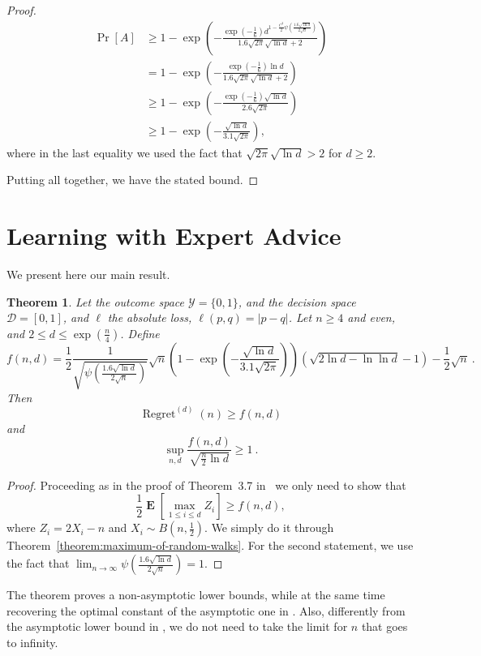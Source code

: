 \documentclass{article}
\DeclareMathOperator*{\Exp}{\mathbf{E}}
\DeclareMathOperator{\Regret}{Regret}
\newtheorem{theorem}{Theorem}
\begin{document}
\begin{proof}
\begin{align*}
\Pr[A]
& \ge 1 - \exp\left(-\frac{\exp\left(-\frac{1}{6}\right) d^{1-\frac{C^2}{2} \psi\left(\frac{1.6 \sqrt{\ln d}}{2 \sqrt{n}}\right)}}{1.6 \sqrt{2\pi} \sqrt{\ln d}+2}\right) \\
& = 1 - \exp\left(-\frac{\exp\left(-\frac{1}{6}\right) \ln d}{1.6 \sqrt{2\pi} \sqrt{\ln d}+2}\right) \\
& \ge 1 - \exp\left(-\frac{\exp\left(-\frac{1}{6}\right) \sqrt{\ln d}}{2.6 \sqrt{2\pi}}\right)\\
& \ge 1 - \exp\left(-\frac{\sqrt{\ln d}}{3.1 \sqrt{2\pi}}\right),
\end{align*}
where in the last equality we used the fact that $\sqrt{2\pi} \sqrt{\ln d} > 2$ for $d\ge 2$.

Putting all together, we have the stated bound.
\end{proof}

\section{Learning with Expert Advice}
\label{section:experts}

We present here our main result.

\begin{theorem}
Let the outcome space $\mathcal{Y}=\{0,1\}$, and the decision space
$\mathcal{D}=[0,1]$, and $\ell$ the absolute loss, $\ell(p,q)=|p-q|$. Let $n
\ge 4$ and even, and $2\le d \le \exp(\frac{n}{4})$.  Define
\[
f(n,d)=\frac{1}{2}\frac{1}{\sqrt{\psi\left(\frac{1.6 \sqrt{\ln d}}{2 \sqrt{n}}\right)}}\sqrt{n}\left(1 - \exp\left(-\frac{\sqrt{\ln d}}{3.1 \sqrt{2\pi}}\right)\right) \left(\sqrt{2 \ln d - \ln \ln d}-1\right) -\frac{1}{2}\sqrt{n}~.
\]
Then
\[
\Regret^{(d)}(n)\ge f(n,d)
\]
and
\[
\sup_{n,d} \frac{f(n,d)}{\sqrt{\frac{n}{2} \ln d}} \ge 1~.
\]
\end{theorem}
%
\begin{proof}
Proceeding as in the proof of Theorem~3.7 in~\citep{Cesa-BianchiL06} we only need to show that
\[
\frac{1}{2} \Exp \left[ \max_{1 \le i \le d} Z_i\right] \ge f(n,d),
\]
where $Z_i= 2 X_i - n$ and $X_i \sim B(n, \frac{1}{2})$. We simply do it through Theorem~\ref{theorem:maximum-of-random-walks}.
For the second statement, we use the fact that $\lim_{n \to \infty} \psi\left(\frac{1.6 \sqrt{\ln d}}{2 \sqrt{n}}\right) = 1$.
\end{proof}

The theorem proves a non-asymptotic lower bounds, while at the same time
recovering the optimal constant of the asymptotic one in
\citet{Cesa-BianchiL06}. Also, differently from the asymptotic lower bound in
\citet{Cesa-BianchiL06}, we do not need to take the limit for $n$ that goes to
infinity.
\end{document}
